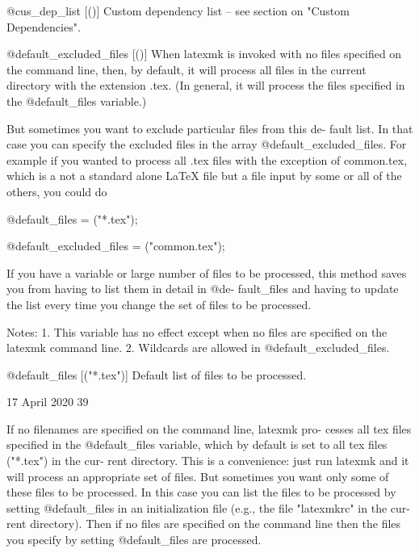        @cus_dep_list [()]
              Custom dependency list -- see section on "Custom Dependencies".

       @default_excluded_files [()]
              When latexmk is invoked with no files specified on  the  command
              line, then, by default, it will process all files in the current
              directory with the extension .tex.  (In general, it will process
              the files specified in the @default_files variable.)

              But sometimes you want to exclude particular files from this de-
              fault list.  In that case you can specify the excluded files  in
              the array @default_excluded_files.  For example if you wanted to
              process all .tex files with the exception of  common.tex,  which
              is a not a standard alone LaTeX file but a file input by some or
              all of the others, you could do

                   @default_files = ("*.tex");

                   @default_excluded_files = ("common.tex");

              If you have a variable or large number of files to be processed,
              this method saves you from having to list them in detail in @de-
              fault_files and having to update the list every time you  change
              the set of files to be processed.

              Notes:  1.  This variable has no effect except when no files are
              specified on the latexmk command line.  2. Wildcards are allowed
              in @default_excluded_files.

       @default_files [("*.tex")]
              Default list of files to be processed.



                                 17 April 2020                              39








              If  no filenames are specified on the command line, latexmk pro-
              cesses all tex files specified in the  @default_files  variable,
              which  by  default is set to all tex files ("*.tex") in the cur-
              rent directory.  This is a convenience: just run latexmk and  it
              will  process  an  appropriate  set of files.  But sometimes you
              want only some of these files to be processed.  In this case you
              can  list the files to be processed by setting @default_files in
              an initialization file (e.g., the file "latexmkrc" in  the  cur-
              rent  directory).  Then if no files are specified on the command
              line then the files you specify by  setting  @default_files  are
              processed.

